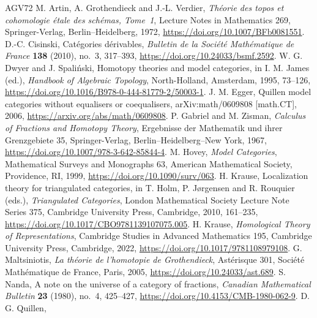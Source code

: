 \documentclass[10pt,a4paper]{amsart}
\theoremstyle{plain}
\theoremstyle{definition}
\theoremstyle{remark}
\begin{document}
\begin{thebibliography}{AGV72}
  M. Artin, A. Grothendieck and J.-L. Verdier,
  \emph{Th\'eorie des topos et cohomologie \'etale des sch\'emas, Tome~1},
  Lecture Notes in Mathematics 269, Springer-Verlag, Berlin--Heidelberg, 1972,
  \url{https://doi.org/10.1007/BFb0081551}.
  D.-C. Cisinski,
  Cat\'egories d\'erivables,
  \emph{Bulletin de la Soci\'et\'e Math\'ematique de France} \textbf{138} (2010), no.~3, 317--393,
  \url{https://doi.org/10.24033/bsmf.2592}.
  W. G. Dwyer and J. Spali\'nski,
  Homotopy theories and model categories,
  in I. M. James (ed.), \emph{Handbook of Algebraic Topology},
  North-Holland, Amsterdam, 1995, 73--126,
  \url{https://doi.org/10.1016/B978-0-444-81779-2/50003-1}.
  J. M. Egger,
  Quillen model categories without equalisers or coequalisers,
  arXiv:math/0609808 [math.CT], 2006,
  \url{https://arxiv.org/abs/math/0609808}.
  P. Gabriel and M. Zisman,
  \emph{Calculus of Fractions and Homotopy Theory},
  Ergebnisse der Mathematik und ihrer Grenzgebiete 35,
  Springer-Verlag, Berlin--Heidelberg--New York, 1967,
  \url{https://doi.org/10.1007/978-3-642-85844-4}.
  M. Hovey,
  \emph{Model Categories},
  Mathematical Surveys and Monographs 63,
  American Mathematical Society, Providence, RI, 1999,
  \url{https://doi.org/10.1090/surv/063}.
  H. Krause,
  Localization theory for triangulated categories,
  in T. Holm, P. J{\o}rgensen and R. Rouquier (eds.), \emph{Triangulated Categories},
  London Mathematical Society Lecture Note Series 375,
  Cambridge University Press, Cambridge, 2010, 161--235,
  \url{https://doi.org/10.1017/CBO9781139107075.005}.
  H. Krause,
  \emph{Homological Theory of Representations},
  Cambridge Studies in Advanced Mathematics 195,
  Cambridge University Press, Cambridge, 2022,
  \url{https://doi.org/10.1017/9781108979108}.
  G. Maltsiniotis,
  \emph{La th\'eorie de l'homotopie de Grothendieck},
  Ast\'erisque 301, Soci\'et\'e Math\'ematique de France, Paris, 2005,
  \url{https://doi.org/10.24033/ast.689}.
  S. Nanda,
  A note on the universe of a category of fractions,
  \emph{Canadian Mathematical Bulletin} \textbf{23} (1980), no.~4, 425--427,
  \url{https://doi.org/10.4153/CMB-1980-062-9}.
  D. G. Quillen,

\end{thebibliography}
\end{document}
